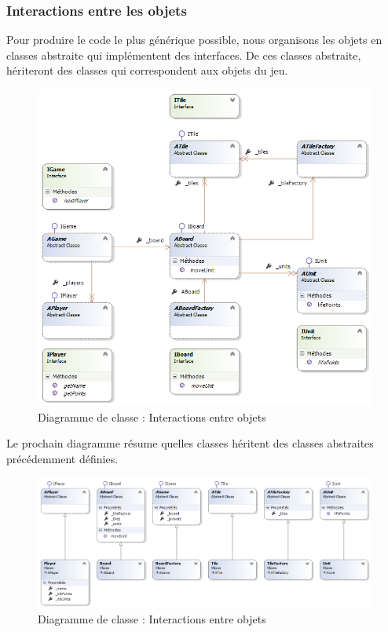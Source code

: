 \subsubsection{Interactions entre les objets}
Pour produire le code le plus générique possible, nous organisons les objets en classes abstraite qui implémentent des interfaces. De ces classes abstraite, hériteront des classes qui correspondent aux objets du jeu.

\begin{figure}[!h] 
\centerline{\includegraphics[width=\textwidth]{img/cd_interactions_between_class.png}}
   \caption{\label{étiquette} Diagramme de classe : Interactions entre objets}
\label{inter_bet_class}
\end{figure}

Le prochain diagramme résume quelles classes héritent des classes abstraites précédemment définies.
\begin{figure}[!h] 
\centerline{\includegraphics[width=\textwidth]{img/cd_inter_with_abstract.png}}
   \caption{\label{étiquette} Diagramme de classe : Interactions entre objets}
\label{inter_with_abstract}
\end{figure}


